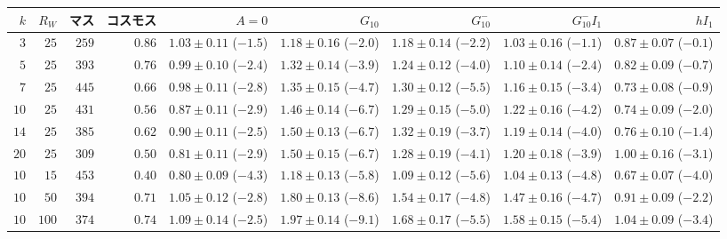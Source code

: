 \begin{tabular}{rrrrrrrrr}
\toprule
$k$ & $R_W$ & マス & コスモス & $A = 0$ & $G_{10}$ & $G_{10}^{-}$ & $G_{10}^{-}I_{1}$ & $hI_{1}$ \\
\midrule
$3$ & $25$ & $259$ & $0.86$ & $1.03 \pm 0.11$ ($-1.5$) & $1.18 \pm 0.16$ ($-2.0$) & $1.18 \pm 0.14$ ($-2.2$) & $1.03 \pm 0.16$ ($-1.1$) & $0.87 \pm 0.07$ ($-0.1$) \\
$5$ & $25$ & $393$ & $0.76$ & $0.99 \pm 0.10$ ($-2.4$) & $1.32 \pm 0.14$ ($-3.9$) & $1.24 \pm 0.12$ ($-4.0$) & $1.10 \pm 0.14$ ($-2.4$) & $0.82 \pm 0.09$ ($-0.7$) \\
$7$ & $25$ & $445$ & $0.66$ & $0.98 \pm 0.11$ ($-2.8$) & $1.35 \pm 0.15$ ($-4.7$) & $1.30 \pm 0.12$ ($-5.5$) & $1.16 \pm 0.15$ ($-3.4$) & $0.73 \pm 0.08$ ($-0.9$) \\
$10$ & $25$ & $431$ & $0.56$ & $0.87 \pm 0.11$ ($-2.9$) & $1.46 \pm 0.14$ ($-6.7$) & $1.29 \pm 0.15$ ($-5.0$) & $1.22 \pm 0.16$ ($-4.2$) & $0.74 \pm 0.09$ ($-2.0$) \\
$14$ & $25$ & $385$ & $0.62$ & $0.90 \pm 0.11$ ($-2.5$) & $1.50 \pm 0.13$ ($-6.7$) & $1.32 \pm 0.19$ ($-3.7$) & $1.19 \pm 0.14$ ($-4.0$) & $0.76 \pm 0.10$ ($-1.4$) \\
$20$ & $25$ & $309$ & $0.50$ & $0.81 \pm 0.11$ ($-2.9$) & $1.50 \pm 0.15$ ($-6.7$) & $1.28 \pm 0.19$ ($-4.1$) & $1.20 \pm 0.18$ ($-3.9$) & $1.00 \pm 0.16$ ($-3.1$) \\
$10$ & $15$ & $453$ & $0.40$ & $0.80 \pm 0.09$ ($-4.3$) & $1.18 \pm 0.13$ ($-5.8$) & $1.09 \pm 0.12$ ($-5.6$) & $1.04 \pm 0.13$ ($-4.8$) & $0.67 \pm 0.07$ ($-4.0$) \\
$10$ & $50$ & $394$ & $0.71$ & $1.05 \pm 0.12$ ($-2.8$) & $1.80 \pm 0.13$ ($-8.6$) & $1.54 \pm 0.17$ ($-4.8$) & $1.47 \pm 0.16$ ($-4.7$) & $0.91 \pm 0.09$ ($-2.2$) \\
$10$ & $100$ & $374$ & $0.74$ & $1.09 \pm 0.14$ ($-2.5$) & $1.97 \pm 0.14$ ($-9.1$) & $1.68 \pm 0.17$ ($-5.5$) & $1.58 \pm 0.15$ ($-5.4$) & $1.04 \pm 0.09$ ($-3.4$) \\
\bottomrule
\end{tabular}
